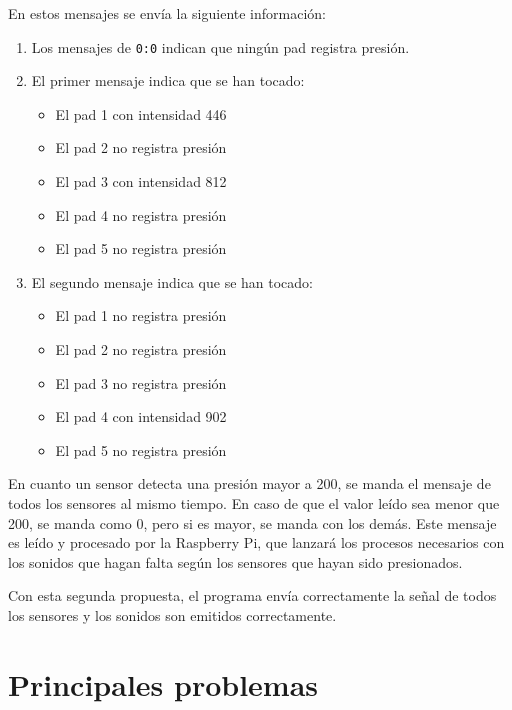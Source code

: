         En estos mensajes se envía la siguiente información:
        
        \begin{enumerate}
            \item Los mensajes de \texttt{0:0} indican que ningún pad registra presión.
            \item El primer mensaje indica que se han tocado:
            \begin{itemize}
                \item El pad 1 con intensidad 446
                \item El pad 2 no registra presión
                \item El pad 3 con intensidad 812
                \item El pad 4 no registra presión
                \item El pad 5 no registra presión
            \end{itemize}
            \item El segundo mensaje indica que se han tocado:
            \begin{itemize}
                \item El pad 1 no registra presión
                \item El pad 2 no registra presión
                \item El pad 3 no registra presión
                \item El pad 4 con intensidad 902
                \item El pad 5 no registra presión
            \end{itemize}
        \end{enumerate}

        En cuanto un sensor detecta una presión mayor a 200, se manda el mensaje de todos los sensores al mismo tiempo.
        En caso de que el valor leído sea menor que 200, se manda como 0, pero si es mayor, se manda con los demás. Este
        mensaje es leído y procesado por la Raspberry Pi, que lanzará los procesos necesarios con los sonidos que hagan
        falta según los sensores que hayan sido presionados.

        Con esta segunda propuesta, el programa envía correctamente la señal de todos los sensores y los sonidos son
        emitidos correctamente.


    \section{Principales problemas} %
    \label{sec:PrincipalesProblemas}

